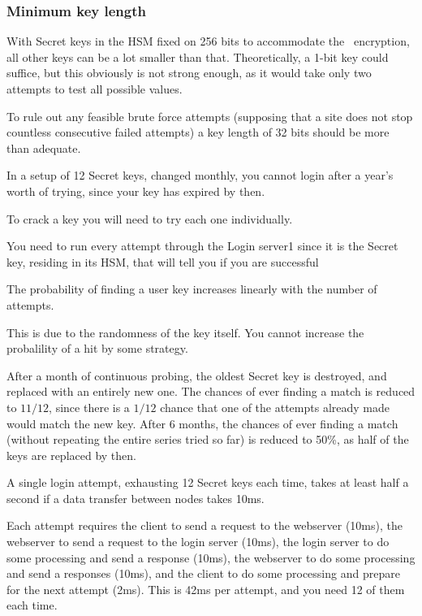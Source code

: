 \subsubsection{Minimum key length}
With Secret keys in the HSM fixed on 256 bits to accommodate the \AES\ encryption,
all other keys can be a lot smaller than that.
Theoretically,
a 1-bit key could suffice,
but this obviously is not strong enough,
as it would take only two attempts to test all possible values.
\par
To rule out any feasible brute force attempts
(supposing that a site does not stop countless consecutive failed attempts)
a key length of 32 bits should be more than adequate.
\par
In a setup of 12 Secret keys, changed monthly,
you cannot login after a year's worth of trying,
since your key has expired by then.
\begin{moafu}
To crack a key you will need to try each one individually.
\end{moafu}
You need to run every attempt through the Login server1
since it is the Secret key,
residing in its HSM,
that will tell you if you are successful
\par
\begin{moafu}
The probability of finding a user key increases linearly with the number of attempts.
\end{moafu}
This is due to the randomness of the key itself.
You cannot increase the probalility of a hit by some strategy.
\par
After a month of continuous probing, the oldest Secret key is destroyed, and replaced with an entirely new one.
The chances of ever finding a match is reduced to
$11/12$,
since there is a $1/12$ chance that one of the attempts already made would match the new key.
After 6 months, the chances of ever finding a match
(without repeating the entire series tried so far)
is reduced to 50\%, as half of the keys are replaced by then.
\begin{moafu}
A single login attempt,
exhausting 12 Secret keys each time,
takes at least half a second if a data transfer between nodes takes 10ms.
\end{moafu}
Each attempt requires the client to send a request to the webserver (10ms),
the webserver to send a request to the login server (10ms),
the login server to do some processing and send a response (10ms),
the webserver to do some processing and send a responses (10ms),
and the client to do some processing and prepare for the next attempt (2ms).
This is 42ms per attempt, and you need 12 of them each time.
